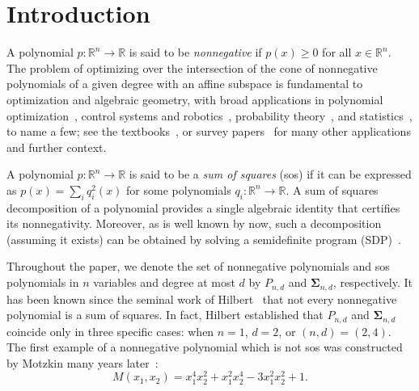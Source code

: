 \documentclass[12pt]{article}
\newcommand{\reals}{\mathbb{R}}
\newcommand{\NN}{P}
\newcommand{\SOS}{\mathbf{\Sigma}}
\theoremstyle{remark}
\begin{document}
\section{Introduction}
A polynomial $p:\mathbb{R}^n\rightarrow\mathbb{R}$ is said to be \emph{nonnegative} if $p(x)\ge 0$ for all $x\in\reals^n$. 
The problem of optimizing over the intersection of the cone of nonnegative polynomials of a given degree with an affine subspace %
is fundamental to optimization and algebraic geometry, with broad applications in polynomial optimization~\cite{lasserre2001global}, control systems and robotics~\cite{henrion2005positive,tedrake2010lqr}, probability theory~\cite{bertsimas2005optimal}, and statistics~\cite{curmei2023shape}, to name a few; see the textbooks~\cite{lasserre2009moments,blekherman2012semidefinite,lasserre2015introduction}, or survey papers~\cite{laurent2009sums,hall2020applications} for many other applications and further context.  

A polynomial $p:\mathbb{R}^n\rightarrow\mathbb{R}$ is said to be a \emph{sum of squares} (sos) if it can be expressed as
$p(x)=\sum_i q_i^2(x)$ for some polynomials $q_i:\mathbb{R}^n\rightarrow\mathbb{R}$. 
A sum of squares decomposition of a polynomial provides a single algebraic identity that certifies its nonnegativity.
Moreover, as is well known by now, such a decomposition (assuming it exists) can be obtained by solving a semidefinite program (SDP)~\cite{Parrilo2000,lasserre2001global,parrilo2003semidefinite}.


Throughout the paper, we denote the set of nonnegative polynomials and sos polynomials in $n$ variables and degree at most $d$ by $\NN_{n,d}$ and $\SOS_{n,d}$, respectively. 
It has been known since the seminal work of Hilbert~\cite{Hilbert1888} that not every nonnegative polynomial is a sum of squares. In fact, Hilbert established that $\NN_{n,d}$ and $\SOS_{n,d}$ coincide only in three specific cases: when $n=1$, $d=2$, or $(n,d)=(2,4)$. The first example of a nonnegative polynomial which is not sos was constructed by Motzkin many years later~\cite{Motzkin1967}:
\begin{equation}\label{eq:motzkin_nonhomo}
M(x_1,x_2)=x_1^4x_2^2+x_1^2x_2^4-3x_1^2x_2^2+1.
\end{equation}
\end{document}
